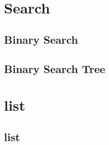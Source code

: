 \documentclass[oneside,12pt,twiside,a4paper]{ctexbook}
\begin{document}
%
\chapter{Search}
\section{Binary Search}
\section{Binary Search Tree}

%
\chapter{list}
\section{list}
\end{document}
